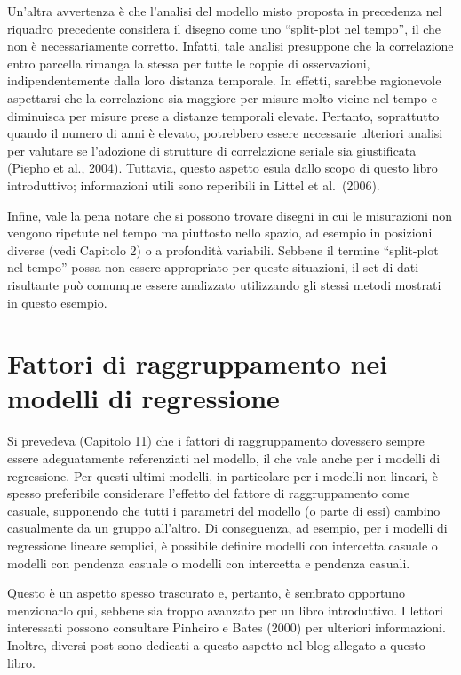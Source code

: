 \documentclass[
  12pt,
]{book}
\begin{document}
Un'altra avvertenza è che l'analisi del modello misto proposta in precedenza nel riquadro precedente considera il disegno come uno ``split-plot nel tempo'', il che non è necessariamente corretto. Infatti, tale analisi presuppone che la correlazione entro parcella rimanga la stessa per tutte le coppie di osservazioni, indipendentemente dalla loro distanza temporale. In effetti, sarebbe ragionevole aspettarsi che la correlazione sia maggiore per misure molto vicine nel tempo e diminuisca per misure prese a distanze temporali elevate. Pertanto, soprattutto quando il numero di anni è elevato, potrebbero essere necessarie ulteriori analisi per valutare se l'adozione di strutture di correlazione seriale sia giustificata (Piepho et al., 2004). Tuttavia, questo aspetto esula dallo scopo di questo libro introduttivo; informazioni utili sono reperibili in Littel et al.~(2006).

Infine, vale la pena notare che si possono trovare disegni in cui le misurazioni non vengono ripetute nel tempo ma piuttosto nello spazio, ad esempio in posizioni diverse (vedi Capitolo 2) o a profondità variabili. Sebbene il termine ``split-plot nel tempo'' possa non essere appropriato per queste situazioni, il set di dati risultante può comunque essere analizzato utilizzando gli stessi metodi mostrati in questo esempio.

\hypertarget{fattori-di-raggruppamento-nei-modelli-di-regressione}{%
\section{Fattori di raggruppamento nei modelli di regressione}\label{fattori-di-raggruppamento-nei-modelli-di-regressione}}

Si prevedeva (Capitolo 11) che i fattori di raggruppamento dovessero sempre essere adeguatamente referenziati nel modello, il che vale anche per i modelli di regressione. Per questi ultimi modelli, in particolare per i modelli non lineari, è spesso preferibile considerare l'effetto del fattore di raggruppamento come casuale, supponendo che tutti i parametri del modello (o parte di essi) cambino casualmente da un gruppo all'altro. Di conseguenza, ad esempio, per i modelli di regressione lineare semplici, è possibile definire modelli con intercetta casuale o modelli con pendenza casuale o modelli con intercetta e pendenza casuali.

Questo è un aspetto spesso trascurato e, pertanto, è sembrato opportuno menzionarlo qui, sebbene sia troppo avanzato per un libro introduttivo. I lettori interessati possono consultare Pinheiro e Bates (2000) per ulteriori informazioni. Inoltre, diversi post sono dedicati a questo aspetto nel blog allegato a questo libro.
\end{document}
